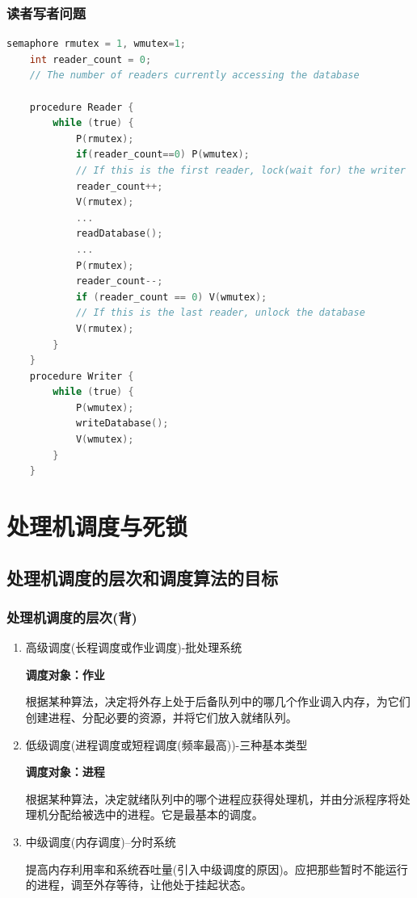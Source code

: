 \documentclass{article}
\begin{document}
\clearpage
\subsubsection{读者写者问题}
\begin{tcolorbox}
    [colback=Emerald!10,colframe=cyan!40!black,title=\textbf{伪代码}]
    \begin{lstlisting}[language=C]
    semaphore rmutex = 1, wmutex=1;
    int reader_count = 0;   
    // The number of readers currently accessing the database
    
    procedure Reader {
        while (true) {
            P(rmutex);
            if(reader_count==0) P(wmutex);
            // If this is the first reader, lock(wait for) the writer
            reader_count++; 
            V(rmutex);
            ...
            readDatabase();
            ...
            P(rmutex);
            reader_count--;
            if (reader_count == 0) V(wmutex);  
            // If this is the last reader, unlock the database
            V(rmutex);
        }
    }
    procedure Writer {
        while (true) {
            P(wmutex);
            writeDatabase();
            V(wmutex);
        }
    }\end{lstlisting}
\end{tcolorbox}


\clearpage
\section{处理机调度与死锁}
\subsection{处理机调度的层次和调度算法的目标}
\subsubsection{{\color{red}处理机调度的层次}{\color{green}(背)}}
\begin{enumerate}
    \item 高级调度(长程调度或作业调度)-批处理系统
    
    \textbf{调度对象：作业}
    
    根据某种算法，决定将外存上处于后备队列中的哪几个作业调入内存，为它们创建进程、分配必要的资源，并将它们放入就绪队列。
    \item 低级调度(进程调度或短程调度(频率最高))-三种基本类型
    
    \textbf{调度对象：进程}

    根据某种算法，决定就绪队列中的哪个进程应获得处理机，并由分派程序将处理机分配给被选中的进程。它是最基本的调度。
    \item 中级调度(内存调度)--分时系统
    
    提高内存利用率和系统吞吐量(引入中级调度的原因)。应把那些暂时不能运行的进程，调至外存等待，让他处于挂起状态。

\end{enumerate}
\end{document}
